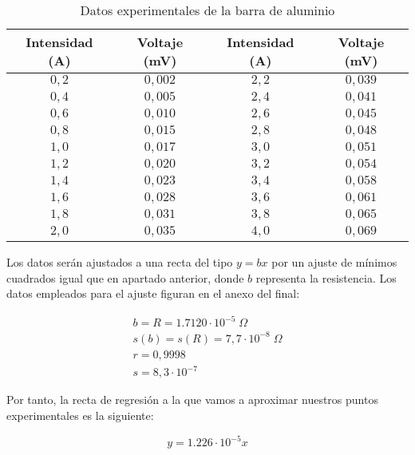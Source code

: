 \documentclass[a4paper,12pt,titlepage]{article}
\begin{document}
\begin{table}[h!]
    \centering
    \begin{tabular}{|c|c|c|c|}
        \hline
        Intensidad (A) & Voltaje (mV) & Intensidad (A) & Voltaje (mV) \\
        \hline
        $0,2$ & $0,002$ & $2,2$ & $0,039$ \\
        \hline
        $0,4$ & $0,005$ & $2,4$ & $0,041$ \\
        \hline
        $0,6$ & $0,010$ & $2,6$ & $0,045$ \\
        \hline
        $0,8$ & $0,015$ & $2,8$ & $0,048$ \\
        \hline
        $1,0$ & $0,017$ & $3,0$ & $0,051$ \\
        \hline
        $1,2$ & $0,020$ & $3,2$ & $0,054$ \\
        \hline
        $1,4$ & $0,023$ & $3,4$ & $0,058$ \\
        \hline
        $1,6$ & $0,028$ & $3,6$ & $0,061$ \\
        \hline
        $1,8$ & $0,031$ & $3,8$ & $0,065$ \\
        \hline
        $2,0$ & $0,035$ & $4,0$ & $0,069$ \\
        \hline
    \end{tabular}
    \caption{Datos experimentales de la barra de aluminio}
\end{table}

Los datos serán ajustados a una recta del tipo $y=bx$ por un ajuste de mínimos cuadrados igual que en apartado anterior, donde $b$ representa la resistencia. Los datos empleados para el ajuste figuran en el anexo del final:

\begin{equation}
    \begin{gathered}
        b = R = 1.7120 \cdot 10^{-5} \; \Omega \\
        s(b) = s(R) = 7,7 \cdot 10^{-8} \; \Omega\\
        r = 0,9998 \\
        s = 8,3\cdot 10^{-7}
    \end{gathered}
\end{equation}

Por tanto, la recta de regresión a la que vamos a aproximar nuestros puntos experimentales es la siguiente:

\begin{equation}
    y = 1.226 \cdot 10^{-5}x
\end{equation}
\end{document}
